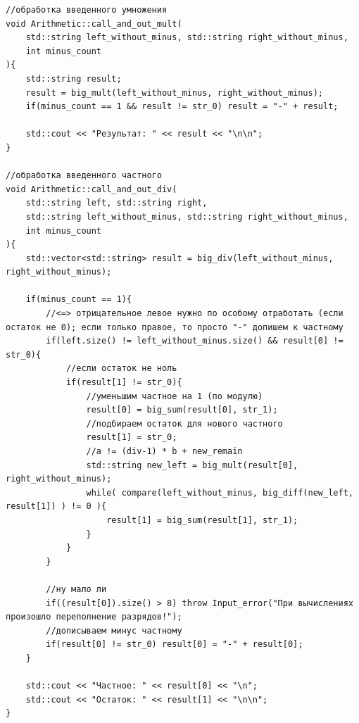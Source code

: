 \begin{lstlisting}[caption=call\_and\_out\_mult и call\_and\_out\_div, label=lst:call-and-out-mult и call-and-out-div]
//обработка введенного умножения
void Arithmetic::call_and_out_mult(
    std::string left_without_minus, std::string right_without_minus,
    int minus_count
){
    std::string result;
    result = big_mult(left_without_minus, right_without_minus);
    if(minus_count == 1 && result != str_0) result = "-" + result;

    std::cout << "Результат: " << result << "\n\n";
}

//обработка введенного частного
void Arithmetic::call_and_out_div(
    std::string left, std::string right, 
    std::string left_without_minus, std::string right_without_minus,
    int minus_count
){
    std::vector<std::string> result = big_div(left_without_minus, right_without_minus);

    if(minus_count == 1){
        //<=> отрицательное левое нужно по особому отработать (если остаток не 0); если только правое, то просто "-" допишем к частному
        if(left.size() != left_without_minus.size() && result[0] != str_0){
            //если остаток не ноль
            if(result[1] != str_0){
                //уменьшим частное на 1 (по модулю)
                result[0] = big_sum(result[0], str_1);
                //подбираем остаток для нового частного
                result[1] = str_0;
                //a != (div-1) * b + new_remain
                std::string new_left = big_mult(result[0], right_without_minus);
                while( compare(left_without_minus, big_diff(new_left, result[1]) ) != 0 ){
                    result[1] = big_sum(result[1], str_1);
                }
            }
        }

        //ну мало ли
        if((result[0]).size() > 8) throw Input_error("При вычислениях произошло переполнение разрядов!");
        //дописываем минус частному
        if(result[0] != str_0) result[0] = "-" + result[0];
    }

    std::cout << "Частное: " << result[0] << "\n";
    std::cout << "Остаток: " << result[1] << "\n\n";
}
\end{lstlisting}
\fi
\newpage
